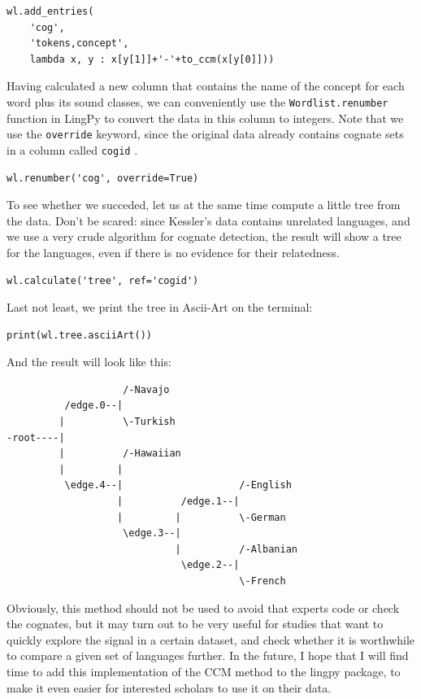 \documentclass[
  a4paper,
  14pt,
  oneside,
  tablecaptionabove
]{scrbook}
\begin{document}
\begin{lstlisting}
wl.add_entries(
    'cog', 
    'tokens,concept', 
    lambda x, y : x[y[1]]+'-'+to_ccm(x[y[0]]))
\end{lstlisting}

Having calculated a new column that contains the name of the concept for
each word plus its sound classes, we can conveniently use the
\lstinline!Wordlist.renumber! function in LingPy to convert the data in
this column to integers. Note that we use the \lstinline!override!
keyword, since the original data already contains cognate sets in a
column called \lstinline!cogid! .

\begin{lstlisting}
wl.renumber('cog', override=True)
\end{lstlisting}

To see whether we succeded, let us at the same time compute a little
tree from the data. Don't be scared: since Kessler's data contains
unrelated languages, and we use a very crude algorithm for cognate
detection, the result will show a tree for the languages, even if there
is no evidence for their relatedness.

\begin{lstlisting}
wl.calculate('tree', ref='cogid')
\end{lstlisting}

Last not least, we print the tree in Ascii-Art on the terminal:

\begin{lstlisting}
print(wl.tree.asciiArt())
\end{lstlisting}

And the result will look like this:

\begin{lstlisting}
                    /-Navajo
          /edge.0--|
         |          \-Turkish
-root----|
         |          /-Hawaiian
         |         |
          \edge.4--|                    /-English
                   |          /edge.1--|
                   |         |          \-German
                    \edge.3--|
                             |          /-Albanian
                              \edge.2--|
                                        \-French
\end{lstlisting}

Obviously, this method should not be used to avoid that experts code or
check the cognates, but it may turn out to be very useful for studies
that want to quickly explore the signal in a certain dataset, and check
whether it is worthwhile to compare a given set of languages further. In
the future, I hope that I will find time to add this implementation of
the CCM method to the lingpy package, to make it even easier for
interested scholars to use it on their data.
\end{document}
